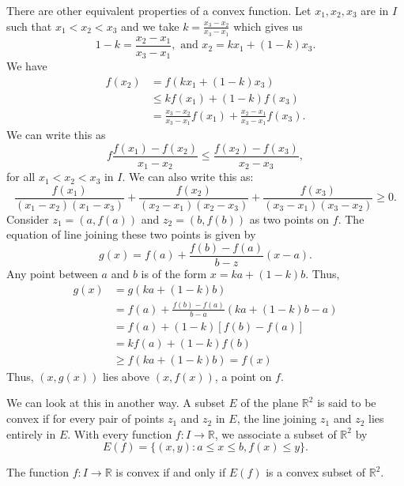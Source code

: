There are other equivalent properties of a convex function. Let $x_1, x_2, x_3$ are in $I$ such that $x_1<x_2<x_3$ and we take $k =
\frac{x_3 - x_2}{x_3 - x_1}$ which gives us
$$1 - k = \frac{x_2 - x_1}{x_3 - x_1},\text{~and~}x_2 = kx_1 + (1 - k)x_3.$$
We have $$\begin{aligned}f(x_2) &= f(kx_1 + (1 - k)x_3)\\&\leq kf(x_1) + (1 - k)f(x_3)\\&=\frac{x_3 - x_2}{x_3 - x_1}f(x_1) +
  \frac{x_2 - x_1}{x_3 - x_1}f(x_3).\end{aligned}$$
We can write this as $$f\frac{f(x_1) - f(x_2)}{x_1 - x_2}\leq\frac{f(x_2) - f(x_3)}{x_2 - x_3},$$
for all $x_1<x_2<x_3$ in $I$. We can also write this as:
$$\frac{f(x_1)}{(x_1 - x_2)(x_1 - x_3)} + \frac{f(x_2)}{(x_2 - x_1)(x_2 - x_3)} + \frac{f(x_3)}{(x_3 - x_1)(x_3 - x_2)}\geq 0.$$
Consider $z_1 = (a, f(a))$ and $z_2 = (b, f(b))$ as two points on $f$. The equation of line joining these two points is given by
$$g(x) = f(a) + \frac{f(b) - f(a)}{b - z}(x - a).$$
Any point between $a$ and $b$ is of the form $x = ka + (1 - k)b$. Thus,
$$\begin{aligned}g(x) & = g(ka + (1 - k)b)\\& = f(a) + \frac{f(b) - f(a)}{b - a}(ka + (1 - k)b - a)\\ & = f(a) + (1 - k)[f(b) -
    f(a)]\\ & = kf(a) + (1 - k)f(b)\\ & \geq f(ka + (1 - k)b) = f(x)\end{aligned}$$
Thus, $(x, g(x))$ lies above $(x, f(x))$, a point on $f$.

We can look at this in another way. A subset $E$ of the plane $\mathbb{R}^2$ is said to be convex if for every pair of points $z_1$
and $z_2$ in $E$, the line joining $z_1$ and $z_2$ lies entirely in $E$. With every function $f: I\rightarrow\mathbb{R}$, we
associate a subset of $\mathbb{R}^2$ by $$E(f) = \{(x, y):a\leq x\leq b, f(x)\leq y\}.$$

\begin{theorem}
  The function $f: I\rightarrow\mathbb{R}$ is convex if and only if $E(f)$ is a convex subset of $\mathbb{R}^2$.
\end{theorem}

